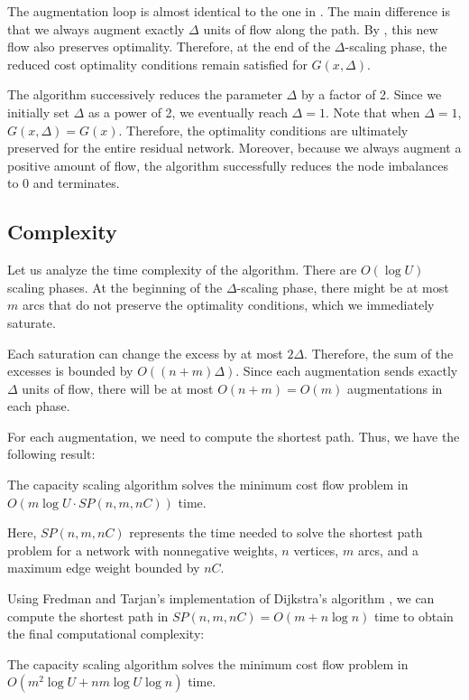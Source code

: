 The augmentation loop is almost identical to the one in . The main difference is that we always augment exactly $\Delta$ units of flow along the path. By , this new flow also preserves optimality. Therefore, at the end of the $\Delta$-scaling phase, the reduced cost optimality conditions remain satisfied for $G(x, \Delta)$.

The algorithm successively reduces the parameter $\Delta$ by a factor of 2. Since we initially set $\Delta$ as a power of 2, we eventually reach $\Delta = 1$. Note that when $\Delta = 1$, $G(x,\Delta) = G(x)$. Therefore, the optimality conditions are ultimately preserved for the entire residual network. Moreover, because we always augment a positive amount of flow, the algorithm successfully reduces the node imbalances to 0 and terminates.

\subsection{Complexity}

Let us analyze the time complexity of the algorithm. There are $O(\log U)$ scaling phases. At the beginning of the $\Delta$-scaling phase, there might be at most $m$ arcs that do not preserve the optimality conditions, which we immediately saturate. 

Each saturation can change the excess by at most $2\Delta$. Therefore, the sum of the excesses is bounded by $O((n+m)\Delta)$. Since each augmentation sends exactly $\Delta$ units of flow, there will be at most $O(n+m) = O(m)$ augmentations in each phase.

For each augmentation, we need to compute the shortest path. Thus, we have the following result:

\begin{theorem}
    The capacity scaling algorithm solves the minimum cost flow problem in $O(m \log U \cdot SP(n,m,nC))$ time.
\end{theorem}

Here, $SP(n,m,nC)$ represents the time needed to solve the shortest path problem for a network with nonnegative weights, $n$ vertices, $m$ arcs, and a maximum edge weight bounded by $nC$. 

Using Fredman and Tarjan's implementation of Dijkstra's algorithm \cite{fredman1987}, we can compute the shortest path in $SP(n,m,nC) = O(m + n\log n)$ time to obtain the final computational complexity:

\begin{theorem}
    The capacity scaling algorithm solves the minimum cost flow problem in $O(m^2 \log U + nm \log U \log n)$ time.
\end{theorem}